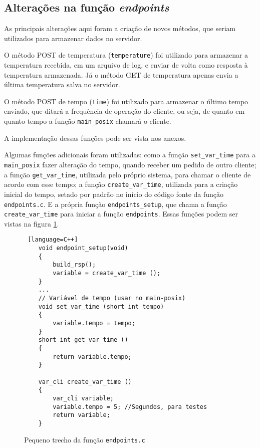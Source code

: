 \hfill \break
\hfill \break
\hfill \break
\hfill \break
\hfill \break
\hfill \break

\subsection{Alterações na função \textit{endpoints}}

As principais alterações aqui foram a criação de novos métodos, que seriam utilizados para armazenar dados no servidor.

O método POST de temperatura (\texttt{temperature}) foi utilizado para armazenar a temperatura recebida, em um arquivo de log, e enviar de volta como resposta à temperatura armazenada. Já o método GET de temperatura apenas envia a última temperatura salva no servidor.

O método POST de tempo (\texttt{time}) foi utilizado para armazenar o último tempo enviado, que ditará a frequência de operação do cliente, ou seja, de quanto em quanto tempo a função \texttt{main\_posix} chamará o cliente.

A implementação dessas funções pode ser vista nos anexos.

Algumas funções adicionais foram utilizadas: como a função \texttt{set\_var\_time} para a \texttt{main\_posix} fazer alteração do tempo, quando receber um pedido de outro cliente; a função \texttt{get\_var\_time}, utilizada pelo próprio sistema, para chamar o cliente de acordo com esse tempo; a função \texttt{create\_var\_time}, utilizada para a criação inicial do tempo, setado por padrão no início do código fonte da função \texttt{endpoints.c}. E a própria função \texttt{endpoints\_setup}, que chama a função \texttt{create\_var\_time} para iniciar a função \texttt{endpoints}. Essas funções podem ser vistas na figura \ref{code:endpoints.c}.

\begin{figure}[!htb]
	\begin{lstlisting} [language=C++]
	void endpoint_setup(void)
	{
		build_rsp();
		variable = create_var_time ();
	}
	...	
	// Variável de tempo (usar no main-posix)
	void set_var_time (short int tempo)
	{
		variable.tempo = tempo;
	}
	short int get_var_time ()
	{
		return variable.tempo;
	}
	
	var_cli create_var_time ()
	{
		var_cli variable;
		variable.tempo = 5; //Segundos, para testes
		return variable;
	}
	\end{lstlisting}
	\caption{Pequeno trecho da função \texttt{endpoints.c}}
	\label{code:endpoints.c}
\end{figure}
